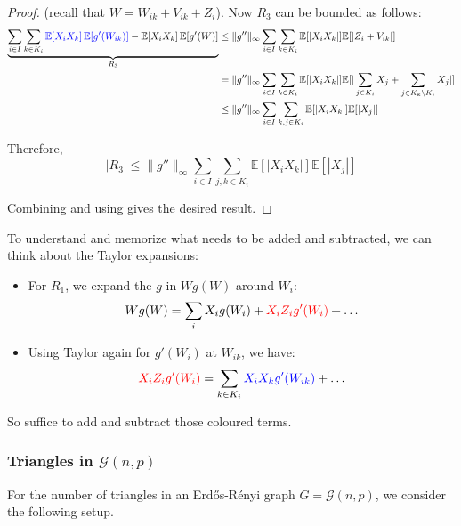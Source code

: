 \documentclass{article}
\begin{document}
\begin{proof}
(recall that $W = W_{ik} + V_{ik} + Z_i$). Now $R_3$ can be bounded as follows:
\begin{align*}
    \underbrace{\sum_{i\in I}\sum_{k\in K_{i}}\textcolor{blue}{\mathbb{E}[X_{i}X_{k}]\operatorname{\mathbb{E}}[g^{\prime}(W_{i k})]}-\mathbb{E}[X_{i}X_{k}]\operatorname{\mathbb{E}}[g^{\prime}(W)]}_{R_3} &\leq \|g''\|_\infty \sum_{i\in I}\sum_{k\in K_{i}}\mathbb{E}[|X_{i}X_{k}|]\mathbb{E}[|Z_i+V_{ik}|]\\
    &=\|g''\|_\infty \sum_{i\in I}\sum_{k\in K_{i}}\mathbb{E}[|X_{i}X_{k}|]\mathbb{E}[|\sum_{j\in K_i} X_j + \sum_{j\in K_k\setminus K_i} X_j|]\\
    &\leq \|g''\|_\infty \sum_{i\in I}\sum_{k,j\in K_{i}}\mathbb{E}[|X_{i}X_{k}|]\mathbb{E}[|X_j|]\\
\end{align*}

Therefore, 
\begin{equation}\label{eq:R3_bound}
    |R_3| \leq \|g''\|_\infty \sum_{i\in I}\sum_{j,k\in K_{i}}\mathbb{E}[|X_{i}X_{k}|]\mathbb{E}[|X_j|]
\end{equation}

Combining  and using  gives the desired result.  

\end{proof}

\begin{remark}
    To understand and memorize what needs to be added and subtracted, we can think about the Taylor expansions:
    \begin{itemize}
        \item For $R_1$, we expand the $g$ in $Wg(W)$ around $W_i$: 
        \[Wg(W) = \sum_i X_i g(W_i) + \textcolor{red}{X_i Z_i g'(W_i)} + \ldots \]
        \item Using Taylor again for $g'(W_i)$ at $W_{ik}$, we have:
        \[
        \textcolor{red}{X_i Z_i g'(W_i)} = \sum_{k\in K_i} \textcolor{blue}{X_i X_k g'(W_{ik})} + \ldots
            \]
    \end{itemize}
    So suffice to add and subtract those coloured terms.  
\end{remark}

\subsubsection{Triangles in $\mathcal{G}(n,p)$}
For the number of triangles in an Erd\H{o}s-R\'{e}nyi graph $G=\mathcal{G}(n,p)$, we consider the following setup.  
\end{document}
